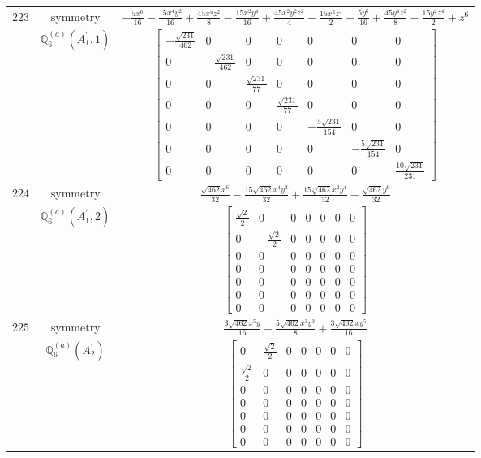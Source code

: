 \documentclass[fleqn,8pt,landscape]{jsarticle}
\begin{document}
\begin{longtable}{ccc}
$ 223 $ & $ \text{symmetry} $ & $ - \frac{5 x^{6}}{16} - \frac{15 x^{4} y^{2}}{16} + \frac{45 x^{4} z^{2}}{8} - \frac{15 x^{2} y^{4}}{16} + \frac{45 x^{2} y^{2} z^{2}}{4} - \frac{15 x^{2} z^{4}}{2} - \frac{5 y^{6}}{16} + \frac{45 y^{4} z^{2}}{8} - \frac{15 y^{2} z^{4}}{2} + z^{6} $ \\
$  $ & $ \mathbb{Q}_{6}^{(a)}(A_{1}^{\prime},1) $ & $ \begin{bmatrix} - \frac{\sqrt{231}}{462} & 0 & 0 & 0 & 0 & 0 & 0 \\ 0 & - \frac{\sqrt{231}}{462} & 0 & 0 & 0 & 0 & 0 \\ 0 & 0 & \frac{\sqrt{231}}{77} & 0 & 0 & 0 & 0 \\ 0 & 0 & 0 & \frac{\sqrt{231}}{77} & 0 & 0 & 0 \\ 0 & 0 & 0 & 0 & - \frac{5 \sqrt{231}}{154} & 0 & 0 \\ 0 & 0 & 0 & 0 & 0 & - \frac{5 \sqrt{231}}{154} & 0 \\ 0 & 0 & 0 & 0 & 0 & 0 & \frac{10 \sqrt{231}}{231} \end{bmatrix} $ \\ \hline
$ 224 $ & $ \text{symmetry} $ & $ \frac{\sqrt{462} x^{6}}{32} - \frac{15 \sqrt{462} x^{4} y^{2}}{32} + \frac{15 \sqrt{462} x^{2} y^{4}}{32} - \frac{\sqrt{462} y^{6}}{32} $ \\
$  $ & $ \mathbb{Q}_{6}^{(a)}(A_{1}^{\prime},2) $ & $ \begin{bmatrix} \frac{\sqrt{2}}{2} & 0 & 0 & 0 & 0 & 0 & 0 \\ 0 & - \frac{\sqrt{2}}{2} & 0 & 0 & 0 & 0 & 0 \\ 0 & 0 & 0 & 0 & 0 & 0 & 0 \\ 0 & 0 & 0 & 0 & 0 & 0 & 0 \\ 0 & 0 & 0 & 0 & 0 & 0 & 0 \\ 0 & 0 & 0 & 0 & 0 & 0 & 0 \\ 0 & 0 & 0 & 0 & 0 & 0 & 0 \end{bmatrix} $ \\ \hline
$ 225 $ & $ \text{symmetry} $ & $ \frac{3 \sqrt{462} x^{5} y}{16} - \frac{5 \sqrt{462} x^{3} y^{3}}{8} + \frac{3 \sqrt{462} x y^{5}}{16} $ \\
$  $ & $ \mathbb{Q}_{6}^{(a)}(A_{2}^{\prime}) $ & $ \begin{bmatrix} 0 & \frac{\sqrt{2}}{2} & 0 & 0 & 0 & 0 & 0 \\ \frac{\sqrt{2}}{2} & 0 & 0 & 0 & 0 & 0 & 0 \\ 0 & 0 & 0 & 0 & 0 & 0 & 0 \\ 0 & 0 & 0 & 0 & 0 & 0 & 0 \\ 0 & 0 & 0 & 0 & 0 & 0 & 0 \\ 0 & 0 & 0 & 0 & 0 & 0 & 0 \\ 0 & 0 & 0 & 0 & 0 & 0 & 0 \end{bmatrix} $ \\ \hline

\end{longtable}
\end{document}
